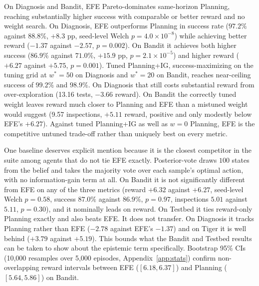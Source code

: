 On Diagnosis and Bandit, EFE Pareto-dominates same-horizon Planning, reaching substantially higher success with comparable or better reward and no weight search. On Diagnosis, EFE outperforms Planning in success rate ($97.2\%$ against $88.8\%$, $+8.3$ pp, seed-level Welch $p{=}4.0{\times}10^{-8}$) while achieving better reward ($-1.37$ against $-2.57$, $p{=}0.002$). On Bandit it achieves both higher success ($86.9\%$ against $71.0\%$, $+15.9$ pp, $p{=}2.1{\times}10^{-5}$) and higher reward ($+6.27$ against $+5.75$, $p{=}0.001$). Tuned Planning+IG, success-maximizing on the tuning grid at $w^*{=}50$ on Diagnosis and $w^*{=}20$ on Bandit, reaches near-ceiling success of $99.2\%$ and $98.9\%$. On Diagnosis that still costs substantial reward from over-exploration (13.16 tests, $-3.66$ reward). On Bandit the correctly tuned weight leaves reward much closer to Planning and EFE than a mistuned weight would suggest (9.57 inspections, $+5.11$ reward, positive and only modestly below EFE's $+6.27$). Against tuned Planning+IG as well as $w{=}0$ Planning, EFE is the competitive untuned trade-off rather than uniquely best on every metric.

One baseline deserves explicit mention because it is the closest competitor in the suite among agents that do not tie EFE exactly. Posterior-vote draws $100$ states from the belief and takes the majority vote over each sample's optimal action, with no information-gain term at all. On Bandit it is not significantly different from EFE on any of the three metrics (reward $+6.32$ against $+6.27$, seed-level Welch $p{=}0.58$, success $87.0\%$ against $86.9\%$, $p{=}0.97$, inspections $5.01$ against $5.11$, $p{=}0.30$), and it nominally leads on reward. On Testbed it ties reward-only Planning exactly and also beats EFE. It does not transfer. On Diagnosis it tracks Planning rather than EFE ($-2.78$ against EFE's $-1.37$) and on Tiger it is well behind ($+3.79$ against $+5.19$). This bounds what the Bandit and Testbed results can be taken to show about the epistemic term specifically. Bootstrap 95\% CIs (10{,}000 resamples over 5{,}000 episodes, Appendix~\ref{app:stats}) confirm non-overlapping reward intervals between EFE ($[6.18, 6.37]$) and Planning ($[5.64, 5.86]$) on Bandit.

